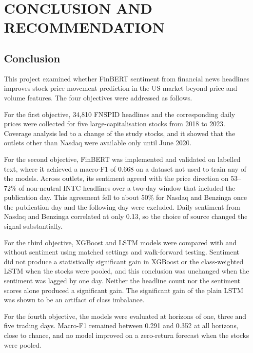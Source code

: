 \chapter{CONCLUSION AND RECOMMENDATION}

\section{Conclusion}
This project examined whether FinBERT sentiment from financial news headlines improves stock price movement prediction in the US market beyond price and volume features. The four objectives were addressed as follows.

For the first objective, 34,810 FNSPID headlines and the corresponding daily prices were collected for five large-capitalisation stocks from 2018 to 2023. Coverage analysis led to a change of the study stocks, and it showed that the outlets other than Nasdaq were available only until June 2020.

For the second objective, FinBERT was implemented and validated on labelled text, where it achieved a macro-F1 of 0.668 on a dataset not used to train any of the models. Across outlets, its sentiment agreed with the price direction on 53--72\% of non-neutral INTC headlines over a two-day window that included the publication day. This agreement fell to about 50\% for Nasdaq and Benzinga once the publication day and the following day were excluded. Daily sentiment from Nasdaq and Benzinga correlated at only 0.13, so the choice of source changed the signal substantially.

For the third objective, XGBoost and LSTM models were compared with and without sentiment using matched settings and walk-forward testing. Sentiment did not produce a statistically significant gain in XGBoost or the class-weighted LSTM when the stocks were pooled, and this conclusion was unchanged when the sentiment was lagged by one day. Neither the headline count nor the sentiment scores alone produced a significant gain. The significant gain of the plain LSTM was shown to be an artifact of class imbalance.

For the fourth objective, the models were evaluated at horizons of one, three and five trading days. Macro-F1 remained between 0.291 and 0.352 at all horizons, close to chance, and no model improved on a zero-return forecast when the stocks were pooled.

